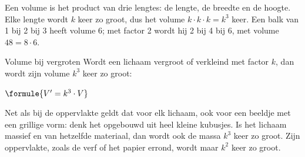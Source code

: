 
Een volume is het product van drie lengtes: de lengte, de breedte en de hoogte. Elke lengte wordt $k$ keer zo groot, dus het volume $k \cdot k \cdot k = k^3$ keer. Een balk van 1 bij 2 bij 3 heeft volume 6; met factor 2 wordt hij 2 bij 4 bij 6, met volume $48 = 8 \cdot 6$.

\begin{theorie}
\begin{stelling}{Volume bij vergroten}
Wordt een lichaam vergroot of verkleind met factor $k$, dan wordt zijn volume $k^3$ keer zo groot:

\vspace{1mm}
\qquad $\formule{V' = k^3 \cdot V}$
\end{stelling}
\end{theorie}

Net als bij de oppervlakte geldt dat voor elk lichaam, ook voor een beeldje met een grillige vorm: denk het opgebouwd uit heel kleine kubusjes. Is het lichaam massief en van hetzelfde materiaal, dan wordt ook de massa $k^3$ keer zo groot. Zijn oppervlakte, zoals de verf of het papier errond, wordt maar $k^2$ keer zo groot.


